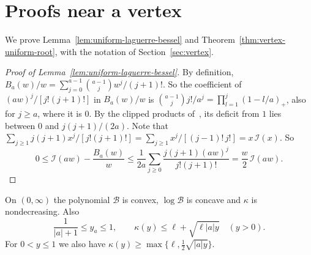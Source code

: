 \section{Proofs near a vertex}\label{app:vertex}

We prove Lemma~\ref{lem:uniform-laguerre-bessel} and Theorem~\ref{thm:vertex-uniform-root},
with the notation of Section~\ref{sec:vertex}.

\begin{proof}[Proof of Lemma~\ref{lem:uniform-laguerre-bessel}]
By definition, $B_a(w)/w=\sum_{j=0}^{a-1}\binom{a-1}j w^j/(j+1)!$. So the
coefficient of $(aw)^j/[j!(j+1)!]$ in $B_a(w)/w$ is
$\binom{a-1}jj!/a^j=\prod_{l=1}^j(1-l/a)_+$, also for $j\ge a$, where it is $0$. By the
clipped products of~\cite[Lemma~3.2(b)]{paperA}, its deficit from $1$ lies between $0$ and
$j(j+1)/(2a)$. Note that $\sum_{j\ge1}j(j+1)x^j/[j!(j+1)!]=\sum_{j\ge1}x^j/[(j-1)!\,j!]=x\,\mathcal I(x)$.
So
\[
0\le\mathcal I(aw)-\frac{B_a(w)}w
\le\frac1{2a}\sum_{j\ge0}\frac{j(j+1)(aw)^j}{j!(j+1)!}
=\frac w2\,\mathcal I(aw).
\]
\end{proof}

\begin{lemma}
\label{lem:vertex-elasticity}
On $(0,\infty)$ the polynomial $\mathcal B$ is convex, $\log\mathcal B$ is concave
and $\kappa$ is nondecreasing. Also
\begin{equation}\label{eq:vertex-elasticity}
 \frac1{|a|+1}\le y_a\le1,\qquad
 \kappa(y)\le \ell+\sqrt{\ell|a|y}\quad(y>0).
\end{equation}
For $0<y\le1$ we also have $\kappa(y)\ge\max\{\ell,\tfrac12\sqrt{|a|y}\}$.
\end{lemma}

